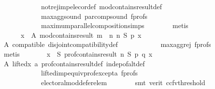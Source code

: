 \begin{isabellebody}
\ \ \ \ \ \ \ \ \ \ \ \ not{\isacharunderscore}{\kern0pt}rej{\isacharunderscore}{\kern0pt}imp{\isacharunderscore}{\kern0pt}elec{\isacharunderscore}{\kern0pt}or{\isacharunderscore}{\kern0pt}def\ mod{\isacharunderscore}{\kern0pt}contains{\isacharunderscore}{\kern0pt}result{\isacharunderscore}{\kern0pt}def\isanewline
\ \ \ \ \ \ \ \ \ \ \ \ max{\isacharunderscore}{\kern0pt}agg{\isacharunderscore}{\kern0pt}sound\ par{\isacharunderscore}{\kern0pt}comp{\isacharunderscore}{\kern0pt}sound\ f{\isacharunderscore}{\kern0pt}profs\isanewline
\ \ \ \ \ \ \ \ \ \ \ \ maximum{\isacharunderscore}{\kern0pt}parallel{\isacharunderscore}{\kern0pt}composition{\isachardot}{\kern0pt}simps\isanewline
\ \ \ \ \ \ \isamarkupfalse%
\ metis\isanewline
\ \ \ \ \isamarkupfalse%
\isanewline
\ \ \ \ \ \ {\isachardoublequoteopen}{\isasymforall}x\ {\isasymin}\ A{\isachardot}{\kern0pt}\ mod{\isacharunderscore}{\kern0pt}contains{\isacharunderscore}{\kern0pt}result\ {\isacharparenleft}{\kern0pt}m\ {\isasymparallel}\isactrlsub {\isasymup}\ n{\isacharparenright}{\kern0pt}\ n\ S\ p\ x{\isachardoublequoteclose}\isanewline
\ \ \ \ \ \ \isamarkupfalse%
\ A\ compatible\ disjoint{\isacharunderscore}{\kern0pt}compatibility{\isacharunderscore}{\kern0pt}def\isanewline
\ \ \ \ \ \ \ \ \ \ \ \ max{\isacharunderscore}{\kern0pt}agg{\isacharunderscore}{\kern0pt}rej{}\ f{\isacharunderscore}{\kern0pt}profs\isanewline
\ \ \ \ \ \ \isamarkupfalse%
\ metis\isanewline
\ \ \ \ \isamarkupfalse%
\ \isamarkupfalse%
\ {\isachardoublequoteopen}{\isasymforall}x\ {\isasymin}\ S{\isachardot}{\kern0pt}\ prof{\isacharunderscore}{\kern0pt}contains{\isacharunderscore}{\kern0pt}result\ n\ S\ p\ q\ x{\isachardoublequoteclose}\isanewline
\ \ \ \ \ \ \isamarkupfalse%
\ A\ lifted{\isacharunderscore}{\kern0pt}x\ a{}\ prof{\isacharunderscore}{\kern0pt}contains{\isacharunderscore}{\kern0pt}result{\isacharunderscore}{\kern0pt}def\ indep{\isacharunderscore}{\kern0pt}of{\isacharunderscore}{\kern0pt}alt{\isacharunderscore}{\kern0pt}def\isanewline
\ \ \ \ \ \ \ \ \ \ \ \ lifted{\isacharunderscore}{\kern0pt}imp{\isacharunderscore}{\kern0pt}equiv{\isacharunderscore}{\kern0pt}prof{\isacharunderscore}{\kern0pt}except{\isacharunderscore}{\kern0pt}a\ f{\isacharunderscore}{\kern0pt}profs\isanewline
\ \ \ \ \ \ \ \ \ \ \ \ electoral{\isacharunderscore}{\kern0pt}mod{\isacharunderscore}{\kern0pt}defer{\isacharunderscore}{\kern0pt}elem\isanewline
\ \ \ \ \ \ \isamarkupfalse%
\ {\isacharparenleft}{\kern0pt}smt\ {\isacharparenleft}{\kern0pt}verit{\isacharcomma}{\kern0pt}\ ccfv{\isacharunderscore}{\kern0pt}threshold{\isacharparenright}{\kern0pt}{\isacharparenright}{\kern0pt}\isanewline

\end{isabellebody}
